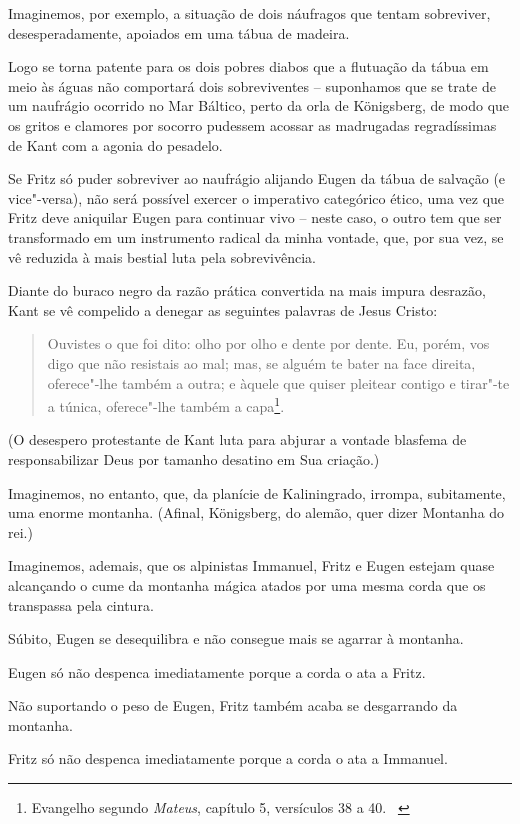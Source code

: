 Imaginemos, por exemplo, a situação de dois náufragos que tentam
sobreviver, desesperadamente, apoiados em uma tábua de madeira.

Logo se torna patente para os dois pobres diabos que a flutuação da
tábua em meio às águas não comportará dois sobreviventes -- suponhamos
que se trate de um naufrágio ocorrido no Mar Báltico, perto da orla de
Königsberg, de modo que os gritos e clamores por socorro pudessem
acossar as madrugadas regradíssimas de Kant com a agonia do pesadelo.

Se Fritz só puder sobreviver ao naufrágio alijando Eugen da tábua de
salvação (e vice"-versa), não será possível exercer o imperativo
categórico ético, uma vez que Fritz deve aniquilar Eugen para continuar
vivo -- neste caso, o outro tem que ser transformado em um instrumento
radical da minha vontade, que, por sua vez, se vê reduzida à mais
bestial luta pela sobrevivência.

Diante do buraco negro da razão prática convertida na mais impura
desrazão, Kant se vê compelido a denegar as seguintes palavras de Jesus
Cristo:

\begin{quote}
Ouvistes o que foi dito: olho por olho e dente por dente. Eu, porém, vos
digo que não resistais ao mal; mas, se alguém te bater na face direita,
oferece"-lhe também a outra; e àquele que quiser pleitear contigo e
tirar"-te a túnica, oferece"-lhe também a capa\footnote{Evangelho segundo
  \emph{Mateus}, capítulo 5, versículos 38 a 40. ~}.
\end{quote}

(O desespero protestante de Kant luta para abjurar a vontade blasfema de
responsabilizar Deus por tamanho desatino em Sua criação.)

Imaginemos, no entanto, que, da planície de Kaliningrado, irrompa,
subitamente, uma enorme montanha. (Afinal, Königsberg, do alemão, quer
dizer Montanha do rei.)

Imaginemos, ademais, que os alpinistas Immanuel, Fritz e Eugen estejam
quase alcançando o cume da montanha mágica atados por uma mesma corda
que os transpassa pela cintura.

Súbito, Eugen se desequilibra e não consegue mais se agarrar à montanha.

Eugen só não despenca imediatamente porque a corda o ata a Fritz.

Não suportando o peso de Eugen, Fritz também acaba se desgarrando da
montanha.

Fritz só não despenca imediatamente porque a corda o ata a Immanuel.

